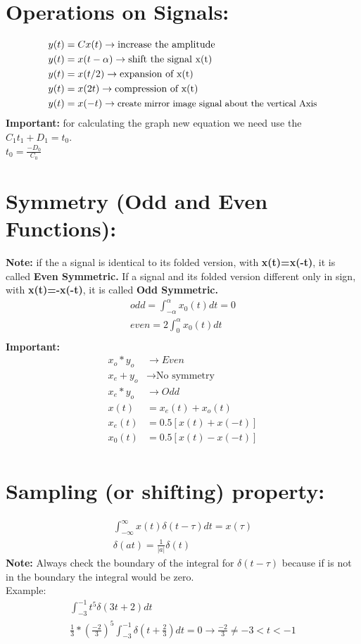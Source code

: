 \documentclass[13pt,a4paper]{article}
\begin{document}
\section{Operations on Signals:}
\begin{align}
    y(t)&=Cx(t)\rightarrow{\text{increase the amplitude}}\\
     y(t)&=x(t-\alpha)\rightarrow{\text{shift the signal x(t)}}\\
     y(t)&=x(t/2)\rightarrow{\text{expansion of x(t)}}\\
     y(t)&=x(2t)\rightarrow{\text{compression of x(t)}}\\         y(t)&=x(-t)\rightarrow{\text{\small{create mirror image signal about the vertical Axis}}}\\
\end{align}
\textbf{Important:} for calculating the graph new equation we need use the $C_1t_1+D_1=t_0$.\\
$
    t_0=\frac{-D_0}{C_0}
$
\section{Symmetry (Odd and Even Functions):}
\textbf{Note:} if the a signal is identical to its folded version, with \textbf{x(t)=x(-t)}, it is called \textbf{Even Symmetric.} If a signal and its folded version different only in sign, with \textbf{x(t)=-x(-t)}, it is called \textbf{Odd Symmetric.}\\
\begin{gather*}
    odd=\int_{-\alpha}^\alpha x_0(t)dt=0\\
    even=2\int_{0}^\alpha x_0(t)dt\\
\end{gather*}
\textbf{Important:}
\begin{align*}
    x_o*y_o&\rightarrow{Even}\\
    x_e+y_o&\rightarrow{\text{No symmetry}}\\
    x_e*y_o&\rightarrow{Odd}\\
    x(t)&=x_e(t)+x_o(t)\\
    x_e(t)&=0.5[x(t)+x(-t)]\\
    x_0(t)&=0.5[x(t)-x(-t)]\\
\end{align*}

\section{Sampling (or shifting) property:}
\begin{gather*}
    \int_{-\infty}^{\infty}x(t)\delta(t-\tau)dt=x(\tau)\\
    \delta(at)=\frac{1}{|a|}\delta(t)
\end{gather*}
\textbf{Note:} Always check the boundary of the integral for $\delta(t-\tau)$ because if is not in the boundary the integral would be zero.\\
Example:
\begin{gather*}
    \int_{-3}^{-1}t^5\delta(3t+2)dt\\
    \frac{1}{3}*(\frac{-2}{3})^5\int_{-3}^{-1}\delta(t+\frac{2}{3})dt=0\rightarrow \frac{-2}{3}\ne -3<t<-1
\end{gather*}
\end{document}
